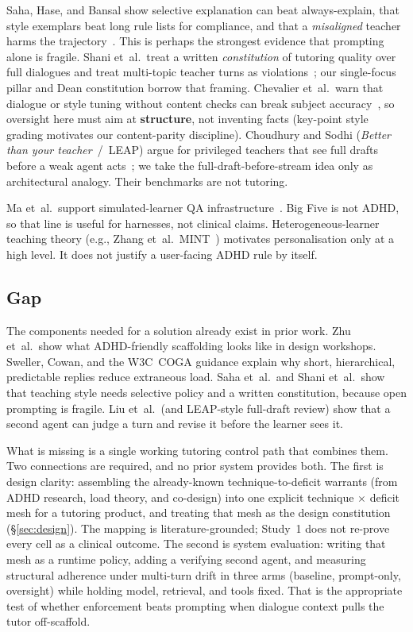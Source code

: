 Saha, Hase, and Bansal show selective explanation can beat always-explain,
that style exemplars beat long rule lists for compliance, and that a
\emph{misaligned} teacher harms the trajectory~\cite{saha2023can}. This is
perhaps the strongest evidence that prompting alone is fragile. Shani et~al.\ treat a
written \emph{constitution} of tutoring quality over full dialogues and treat
multi-topic teacher turns as violations~\cite{shani2024multiturn}; our
single-focus pillar and Dean constitution borrow that framing. Chevalier
et~al.\ warn that dialogue or style tuning without content checks can break
subject accuracy~\cite{chevalier2024lmscience}, so oversight here must aim at
\textbf{structure}, not inventing facts (key-point style grading motivates our
content-parity discipline). Choudhury and Sodhi (\emph{Better than your
teacher}~/~LEAP) argue for privileged teachers that see full drafts before a
weak agent acts~\cite{choudhury2025better}; we take the
full-draft-before-stream idea only as architectural analogy. Their benchmarks
are not tutoring.

Ma et~al.\ support simulated-learner QA infrastructure~\cite{ma2025students}.
Big Five is not ADHD, so that line is useful for harnesses, not clinical
claims. Heterogeneous-learner teaching theory (e.g., Zhang et~al.\
MINT~\cite{zhang2023nonparametric}) motivates personalisation only at a high
level. It does not justify a user-facing ADHD rule by itself.

\subsection{Gap}
\label{sec:gap}

The components needed for a solution already exist in prior work. Zhu et~al.\
show what ADHD-friendly scaffolding looks like in design workshops. Sweller,
Cowan, and the W3C~COGA guidance explain why short, hierarchical, predictable
replies reduce extraneous load. Saha et~al.\ and Shani et~al.\ show that
teaching style needs selective policy and a written constitution, because
open prompting is fragile. Liu et~al.\ (and LEAP-style full-draft review)
show that a second agent can judge a turn and revise it before the learner
sees it.

What is missing is a single working tutoring control path that combines them.
Two connections are required, and no prior system provides both. The first is
design clarity: assembling the already-known technique-to-deficit warrants
(from ADHD research, load theory, and co-design) into one explicit technique
$\times$ deficit mesh for a tutoring product, and treating that mesh as the
design constitution (\S\ref{sec:design}). The mapping is literature-grounded;
Study~1 does not re-prove every cell as a clinical outcome. The second is
system evaluation: writing that mesh as a runtime policy, adding a verifying
second agent, and measuring structural adherence under multi-turn drift in
three arms (baseline, prompt-only, oversight) while holding model, retrieval,
and tools fixed. That is the appropriate test of whether enforcement beats
prompting when dialogue context pulls the tutor off-scaffold.

